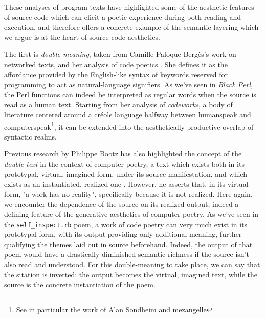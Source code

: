 These analyses of program texts have highlighted some of the aesthetic features of source code which can elicit a poetic experience during both reading and execution, and therefore offers a concrete example of the semantic layering which we argue is at the heart of source code aesthetics.

The first is \emph{double-meaning}, taken from Camille Paloque-Bergès's work on networked texts, and her analysis of code poetics \citep{paloque-berges_poetique_2009}. She defines it as the affordance provided by the English-like syntax of keywords reserved for programming to act as natural-language signifiers. As we've seen in \emph{Black Perl}, the Perl functions can indeed be interpreted as regular words when the source is read as a human text. Starting from her analysis of \emph{codeworks}, a body of literature centered around a créole language halfway between humanspeak and computerspeak\footnote{See in particular the work of Alan Sondheim and mezangelle}, it can be extended into the aesthetically productive overlap of syntactic realms.

Previous research by Philippe Bootz has also highlighted the concept of the \emph{double-text} in the context of computer poetry, a text which exists both in its prototypal, virtual, imagined form, under its source manifestation, and which exists as an instantiated, realized one \citep{bootz_problem_2005}. However, he asserts that, in its virtual form, "a work has no reality", specifically because  it is not realized. Here again, we encounter the dependence of the source on its realized output, indeed a defining feature of the generative aesthetics of computer poetry. As we've seen in the \lstinline{self_inspect.rb} poem, a work of code poetry can very much exist in its prototypal form, with its output providing only additional meaning, further qualifying the themes laid out in source beforehand. Indeed, the output of that poem would have a drastically diminished semantic richness if the source isn't also read and understood. For this double-meaning to take place, we can say that the sitation is inverted: the output becomes the virtual, imagined text, while the source is the concrete instantiation of the poem.

